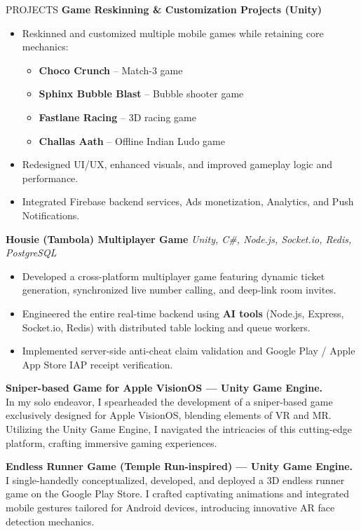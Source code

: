 \documentclass{resume} %
\begin{document}
\begin{rSection}{PROJECTS}
\textbf{Game Reskinning \& Customization Projects (Unity)}
\begin{itemize}
    \itemsep -3pt {}
     \item Reskinned and customized multiple mobile games while retaining core mechanics:
     \begin{itemize}
         \item \textbf{Choco Crunch} -- Match-3 game
         \item \textbf{Sphinx Bubble Blast} -- Bubble shooter game
         \item \textbf{Fastlane Racing} -- 3D racing game
         \item \textbf{Challas Aath} -- Offline Indian Ludo game
     \end{itemize}
     \item Redesigned UI/UX, enhanced visuals, and improved gameplay logic and performance.
     \item Integrated Firebase backend services, Ads monetization, Analytics, and Push Notifications.
\end{itemize}

\textbf{Housie (Tambola) Multiplayer Game} \hfill \textit{Unity, C\#, Node.js, Socket.io, Redis, PostgreSQL}
\begin{itemize}
    \itemsep -3pt {}
     \item Developed a cross-platform multiplayer game featuring dynamic ticket generation, synchronized live number calling, and deep-link room invites.
     \item Engineered the entire real-time backend using \textbf{AI tools} (Node.js, Express, Socket.io, Redis) with distributed table locking and queue workers.
     \item Implemented server-side anti-cheat claim validation and Google Play / Apple App Store IAP receipt verification.
\end{itemize}

\textbf{Sniper-based Game for Apple VisionOS --- Unity Game Engine.} \\
In my solo endeavor, I spearheaded the development of a sniper-based game exclusively designed for Apple VisionOS, blending elements of VR and MR. Utilizing the Unity Game Engine, I navigated the intricacies of this cutting-edge platform, crafting immersive gaming experiences.

\textbf{Endless Runner Game (Temple Run-inspired) --- Unity Game Engine.} \\
I single-handedly conceptualized, developed, and deployed a 3D endless runner game on the Google Play Store. I crafted captivating animations and integrated mobile gestures tailored for Android devices, introducing innovative AR face detection mechanics.

\end{rSection}
\end{document}
